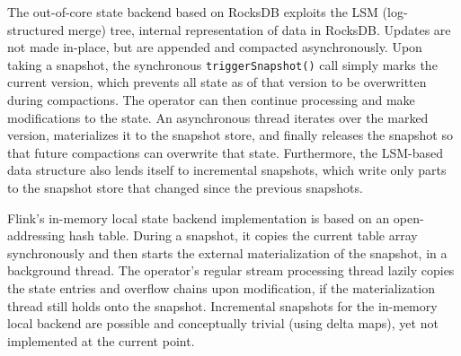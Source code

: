 
The out-of-core state backend based on RocksDB \cite{CUSTOM:web/rocksdb} exploits the LSM (log-structured merge) tree, internal representation of data in RocksDB. 
Updates are not made in-place, but are appended and compacted asynchronously. Upon taking a snapshot, the synchronous \texttt{triggerSnapshot()} call simply marks the current version, which prevents all state as of that version to be overwritten during compactions. The operator can then continue processing and make modifications to the state. An asynchronous thread iterates over the marked version, materializes it to the snapshot store, and finally releases the snapshot so that future compactions can overwrite that state. Furthermore, the LSM-based data structure also lends itself to incremental snapshots, which write only parts to the snapshot store that changed since the previous snapshots.

Flink's in-memory local state backend implementation is based on an open-addressing hash table. During a snapshot, it copies the current table array synchronously and then starts the external materialization of the snapshot, in a background thread. The operator's regular stream processing thread lazily copies the state entries and overflow chains upon modification, if the materialization thread still holds onto the snapshot. Incremental snapshots for the in-memory local backend are  possible and conceptually trivial (using delta maps), yet not implemented at the current point. 

